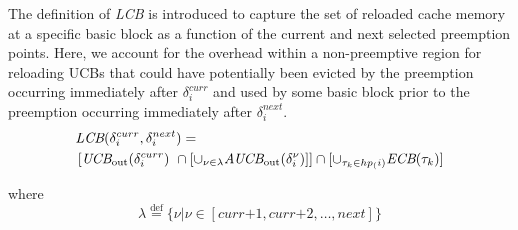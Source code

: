 The definition of \textit{LCB} is introduced to capture the set of reloaded cache memory at a specific basic block as a function of the current and next selected preemption points.  Here, we account for the overhead within a non-preemptive region for reloading UCBs that could have potentially been evicted by the preemption occurring immediately after $\delta_i^{curr}$ and used by some basic block prior to the preemption occurring immediately after $\delta_i^{next}$.
\begin{equation}\label{eqn:lcb-formula-1}
\begin{split}
    \lefteqn{\textit{LCB}(\delta_{i}^{curr},\delta_{i}^{next}) =} & \\
    &\left[\textit{UCB}_{\textrm{out}}(\delta_{i}^{curr})\ \cap \left[\cup_{\nu \in \lambda} \textit{AUCB}_{\textrm{out}}(\delta_{i}^{\nu})\right]\right] \cap [\cup_{\tau_{k}\in hp_(i)} \textit{ECB}(\tau_{k})]\\
\end{split}
\end{equation}

\noindent
where
\begin{equation*}\label{eqn:lcb-formula-1b}
    \lambda \stackrel{\text{def}}{=} \{ \nu|\nu \in [ \textit{curr+1}, \textit{curr+2}, \ldots, \textit{next} ] \}
\end{equation*}


